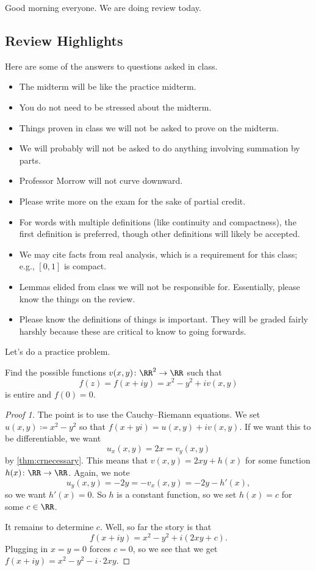 \documentclass[../notes.tex]{subfiles}
\begin{document}

Good morning everyone. We are doing review today.

\subsection{Review Highlights}
Here are some of the answers to questions asked in class.
\begin{itemize}
	\item The midterm will be like the practice midterm.
	\item You do not need to be stressed about the midterm.
	\item Things proven in class we will not be asked to prove on the midterm.
	\item We will probably will not be asked to do anything involving summation by parts.
	\item Professor Morrow will not curve downward.
	\item Please write more on the exam for the sake of partial credit.
	\item For words with multiple definitions (like continuity and compactness), the first definition is preferred, though other definitions will likely be accepted.
	\item We may cite facts from real analysis, which is a requirement for this class; e.g., $[0,1]$ is compact.
	\item Lemmas elided from class we will not be responsible for. Essentially, please know the things on the review.
	\item Please know the definitions of things is important. They will be graded fairly harshly because these are critical to know to going forwards.
\end{itemize}
Let's do a practice problem.
\begin{exe}
	Find the possible functions $v(x,y)\colon \RR^2\to\RR$ such that
	\[f(z)=f(x+iy)=x^2-y^2+iv(x,y)\]
	is entire and $f(0)=0$.
\end{exe}
\begin{proof}[Proof 1]
	The point is to use the Cauchy--Riemann equations. We set $u(x,y)\coloneqq x^2-y^2$ so that $f(x+yi)=u(x,y)+iv(x,y)$. If we want this to be differentiable, we want
	\[u_x(x,y)=2x=v_y(x,y)\]
	by \autoref{thm:crnecessary}. This means that $v(x,y)=2xy+h(x)$ for some function $h(x)\colon \RR\to\RR$. Again, we note
	\[u_y(x,y)=-2y=-v_x(x,y)=-2y-h'(x),\]
	so we want $h'(x)=0$. So $h$ is a constant function, so we set $h(x)=c$ for some $c\in\RR$.

	It remains to determine $c$. Well, so far the story is that
	\[f(x+iy)=x^2-y^2+i(2xy+c).\]
	Plugging in $x=y=0$ forces $c=0$, so we see that we get $\boxed{f(x+iy)=x^2-y^2-i\cdot 2xy}$.
\end{proof}
\end{document}
